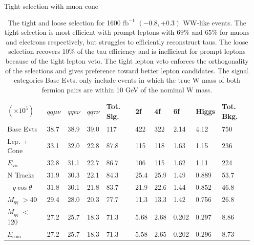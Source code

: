 \begin{table}

\caption{The tight and loose selection for 1600 $\text{fb}^{-1}$ $(-0.8,+0.3)$ WW-like events. The tight selection is most efficient with prompt leptons with $69\%$ and $65\%$  for muons and electrons respectively, but struggles to efficiently reconstruct taus. The loose selection recovers $10\%$ of the tau efficiency and is inefficient for prompt leptons because of the tight lepton veto. The tight lepton veto enforces the orthogonality of the selections and gives preference toward better lepton candidates. The signal categories Base Evts. only include events in which the true W mass of both fermion pairs are within 10 GeV of the nominal W mass.}
\label{tab:selection}
 \scriptsize
 Tight selection with muon cone \\
   \begin{tabular}{|p{}|p{}p{}p{}|p{}|p{}p{}p{}p{}|p{}|}
\hline 
 $(\times 10^5)$  & $qq\mu\nu$ & $qqe\nu$ & $qq\tau\nu$ & Tot. Sig. & 2f & 4f & 6f & Higgs & Tot. Bkg. \\ \hline 
Base Evts & {38.7 } &  {38.9 } &  {39.0} & {117} &  {422} &  {322} &  {2.14} &  {4.12} & 750 \\ 

Lep. + Cone & {33.1 } &  {32.0 } &  {22.8} & {87.8} &  {115} &  {118} &  {1.63} &  {1.15} & 236 \\ 
 
$E_{\text{vis}}$ & {32.8 } &  {31.1 } &  {22.7} & {86.7} &  {106} &  {115} &  {1.62} &  {1.11} & 224\\ 
 
N Tracks & {31.9 } &  {30.3 } &  {22.1} & {84.3} &  {25.4} &  {25.9} &  {1.49} &  {0.889} & 53.7\\ 
 
$-q\cos\theta$ & {31.8 } &  {30.1 } &  {21.8} & {83.7} &  {21.9} &  {22.6} &  {1.44} &  {0.852} & 46.8\\ 
 
$M_{qq}$ $>$40 & {29.4 } &  {28.0 } &  {20.3} & {77.7} &  {11.3} &  {13.3} &  {1.42} &  {0.756} & 26.8\\ 
 
$M_{qq}$ $<$120 & {27.2 } &  {25.7 } &  {18.3} & {71.3} &  {5.68} &  {2.68} &  {0.202} &  {0.297} & 8.86\\ 
 
$E_{\text{com}}$ & {27.2 } &  {25.7} &  {18.3} & {71.3} &  {5.58} &  {2.65} &  {0.202} &  {0.296} & 8.73\\ 


\end{tabular}
\end{table}
